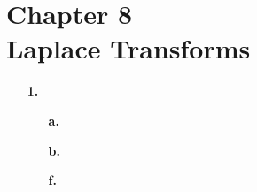 
\section{Chapter 8\\{\large Laplace Transforms}}

\begin{enumerate}
	\setlength{\itemsep}{\bigskipamount}
	\item[\textbf{1.}]
		\begin{enumerate}
			\item[\textbf{a.}]


			\item[\textbf{b.}]


			\item[\textbf{f.}]


		\end{enumerate}
\end{enumerate}